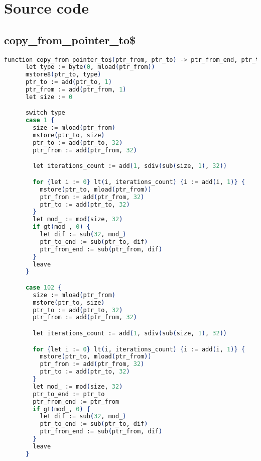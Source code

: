 \appendix
{}
\chapter{Source code}
\section{copy\_from\_pointer\_to\$}
\label{appex:copy_from_pointer_to}
  \begin{lstlisting}[language=elixir]
    function copy_from_pointer_to$(ptr_from, ptr_to) -> ptr_from_end, ptr_to_end {
      let type := byte(0, mload(ptr_from))
      mstore8(ptr_to, type)
      ptr_to := add(ptr_to, 1)
      ptr_from := add(ptr_from, 1)
      let size := 0

      switch type
      case 1 {
        size := mload(ptr_from)
        mstore(ptr_to, size)
        ptr_to := add(ptr_to, 32)
        ptr_from := add(ptr_from, 32)

        let iterations_count := add(1, sdiv(sub(size, 1), 32))

        for {let i := 0} lt(i, iterations_count) {i := add(i, 1)} {
          mstore(ptr_to, mload(ptr_from))
          ptr_from := add(ptr_from, 32)
          ptr_to := add(ptr_to, 32)
        }
        let mod_ := mod(size, 32)
        if gt(mod_, 0) {
          let dif := sub(32, mod_)
          ptr_to_end := sub(ptr_to, dif)
          ptr_from_end := sub(ptr_from, dif)
        }
        leave
      }

      case 102 {
        size := mload(ptr_from)
        mstore(ptr_to, size)
        ptr_to := add(ptr_to, 32)
        ptr_from := add(ptr_from, 32)

        let iterations_count := add(1, sdiv(sub(size, 1), 32))

        for {let i := 0} lt(i, iterations_count) {i := add(i, 1)} {
          mstore(ptr_to, mload(ptr_from))
          ptr_from := add(ptr_from, 32)
          ptr_to := add(ptr_to, 32)
        }
        let mod_ := mod(size, 32)
        ptr_to_end := ptr_to
        ptr_from_end := ptr_from
        if gt(mod_, 0) {
          let dif := sub(32, mod_)
          ptr_to_end := sub(ptr_to, dif)
          ptr_from_end := sub(ptr_from, dif)
        }
        leave
      }


\end{lstlisting}
